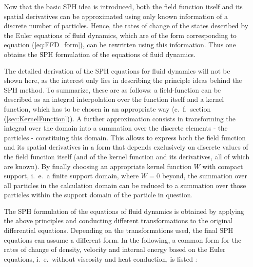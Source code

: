 \documentclass{report}
\begin{document}
Now that the basic SPH idea is introduced, both the field function
itself and its spatial derivatives can be approximated using only known information 
of a discrete number of particles. Hence, the rates of change of
the states described by the Euler equations of fluid dynamics, which are of the form
corresponding to equation (\ref{eq:EFD_form}), can be rewritten using this information. Thus 
one obtains the SPH formulation of the equations of fluid dynamics.

The detailed derivation of the SPH equations for fluid dynamics will not be shown here, as the
interest  only lies in describing the principle ideas behind the SPH
method. To summarize, these are as follows: a field-function can be
described as an integral interpolation over the function itself and a kernel
function, which has to be chosen in an appropriate way (c.\ f.\ section (\ref{sec:KernelFunction})). A further
approximation consists in transforming the integral over the domain into a
summation over the discrete elements - the particles - constituing this domain. 
This allows to express both
the field function and its spatial derivatives in a form  
that depends exclusively on discrete values
of the field function itself (and of the kernel function and its derivatives, 
all of which are known). By finally choosing an appropriate kernel function $W$ with
compact support, i.\ e.\ a finite support domain, where $W=0$ beyond, the summation over all particles in the calculation domain can be reduced
to a summation over those particles within the support domain of the particle
in question.

The SPH formulation of the equations of fluid
dynamics is obtained by applying the above principles and conducting different
transformations to the original differential equations. %
Depending on the
transformations used, the final SPH equations can assume a different form. In
the following, a common form for the rates of change of density, velocity and
internal energy based on the Euler equations, i.\ e.\ without viscosity and heat conduction, is listed \cite{Monaghan2005,Liu2003}: 
\end{document}
